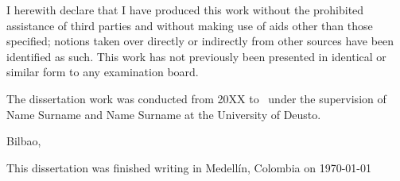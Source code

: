 



\ifpdf
    \graphicspath{{9_backmatter/figures/PNG/}{9_backmatter/figures/PDF/}{9_backmatter/figures/}}
\else
    \graphicspath{{9_backmatter/figures/EPS/}{9_backmatter/figures/}}
\fi



\begin{declaration}        %

I herewith declare that I have produced this work without the prohibited assistance of third parties and without making use of aids other than those specified; notions taken over directly or indirectly from other sources have been identified as such. This work has not previously been presented in identical or similar form to any examination board.

The dissertation work was conducted from 20XX to \the\year \ under the supervision of
Name Surname
and 
Name Surname
at 
the University of Deusto.

\vspace{10mm}

Bilbao,




\end{declaration}




\thispagestyle{empty}

\hfill
\vfill
\medskip

\begin{center}
\noindent
This dissertation was finished writing 
in 
Medellín, Colombia
on
\today 
\end{center}

